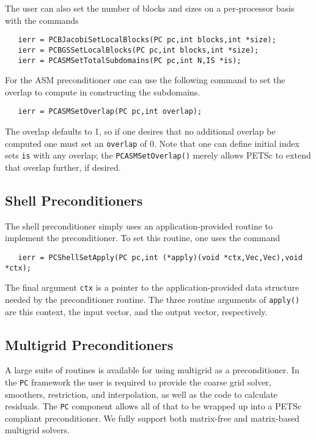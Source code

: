 The user can also set the number of blocks and sizes on a per-processor
basis with the commands
\begin{verbatim}
   ierr = PCBJacobiSetLocalBlocks(PC pc,int blocks,int *size);
   ierr = PCBGSSetLocalBlocks(PC pc,int blocks,int *size);
   ierr = PCASMSetTotalSubdomains(PC pc,int N,IS *is);
\end{verbatim}

For the ASM preconditioner one can use the following command to set
the overlap to compute in constructing the subdomains.
\begin{verbatim}
   ierr = PCASMSetOverlap(PC pc,int overlap);
\end{verbatim}
The 
 overlap defaults to 1, so if one desires that no additional overlap 
be computed one must set an {\tt overlap} of 0. Note that one can
define initial index sets {\tt is} with any overlap;
the {\tt PCASMSetOverlap()} merely allows PETSc to extend 
that overlap further, if desired.

\subsection{Shell Preconditioners}

The shell preconditioner simply uses an application-provided routine to 
implement the preconditioner. To set this routine, one uses the 
command 
\begin{verbatim}
   ierr = PCShellSetApply(PC pc,int (*apply)(void *ctx,Vec,Vec),void *ctx);
\end{verbatim}
The final argument {\tt ctx} is a pointer to the application-provided 
data structure needed by the preconditioner routine.
The three routine arguments of {\tt apply()} are this context, the
input vector, and the output vector, respectively.

\subsection{Multigrid Preconditioners} 

A large suite of routines is available for using multigrid as a
preconditioner. In the {\tt PC} framework the user is required to provide 
the coarse grid solver, smoothers, restriction, and interpolation, 
as well as the code to calculate residuals. The {\tt PC} component 
allows all of that to be wrapped up into a PETSc compliant preconditioner. 
We fully support both matrix-free and matrix-based multigrid solvers.


